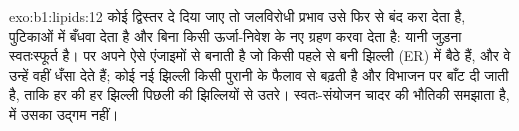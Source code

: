 \begin{solution}{exo:b1:lipids:12}
कोई द्विस्तर दे दिया जाए तो जलविरोधी प्रभाव उसे फिर से बंद करा देता है,
पुटिकाओं में बँधवा देता है और बिना किसी ऊर्जा-निवेश के नए  ग्रहण
करवा देता है: यानी जुड़ना स्वतःस्फूर्त है। पर  अपने  ऐसे
एंजाइमों से बनाती है जो किसी पहले से बनी झिल्ली (ER) में बैठे हैं, और वे
उन्हें वहीं धँसा देते हैं; कोई नई झिल्ली किसी पुरानी के फैलाव से बढ़ती है
और विभाजन पर बाँट दी जाती है, ताकि हर  की हर झिल्ली पिछली  की
झिल्लियों से उतरे। स्वतः-संयोजन चादर की भौतिकी समझाता है,  में उसका
उद्गम नहीं।
\end{solution}


